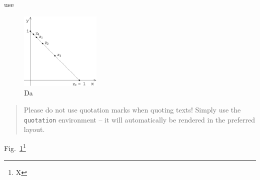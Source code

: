 use 
\begin{figure}[!ht]
	\sidecaption[t]
	\includegraphics[width=0.343\textwidth]{./img/example}
	\caption{Da}
	\label{fig:1}       %
\end{figure}

\eject


\enlargethispage{24pt}

\begin{quotation}
Please do not use quotation marks when quoting texts! Simply use the \verb|quotation| environment -- it will automatically be rendered in the preferred layout.
\end{quotation}

Fig.~\ref{fig:1}\footnote{X}
